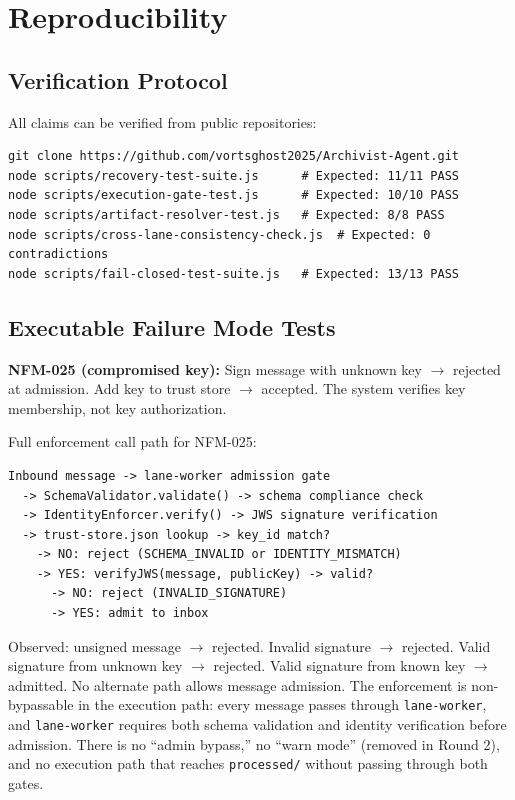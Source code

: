 \documentclass[11pt,letterpaper]{article}
\begin{document}
\section{Reproducibility}

\subsection{Verification Protocol}

All claims can be verified from public repositories:

\begin{verbatim}
git clone https://github.com/vortsghost2025/Archivist-Agent.git
node scripts/recovery-test-suite.js      # Expected: 11/11 PASS
node scripts/execution-gate-test.js      # Expected: 10/10 PASS
node scripts/artifact-resolver-test.js   # Expected: 8/8 PASS
node scripts/cross-lane-consistency-check.js  # Expected: 0 contradictions
node scripts/fail-closed-test-suite.js   # Expected: 13/13 PASS
\end{verbatim}

\subsection{Executable Failure Mode Tests}

\textbf{NFM-025 (compromised key):} Sign message with unknown key $\rightarrow$ rejected at admission. Add key to trust store $\rightarrow$ accepted. The system verifies key membership, not key authorization.

Full enforcement call path for NFM-025:

\begin{verbatim}
Inbound message -> lane-worker admission gate
  -> SchemaValidator.validate() -> schema compliance check
  -> IdentityEnforcer.verify() -> JWS signature verification
  -> trust-store.json lookup -> key_id match?
    -> NO: reject (SCHEMA_INVALID or IDENTITY_MISMATCH)
    -> YES: verifyJWS(message, publicKey) -> valid?
      -> NO: reject (INVALID_SIGNATURE)
      -> YES: admit to inbox
\end{verbatim}

Observed: unsigned message $\rightarrow$ rejected. Invalid signature $\rightarrow$ rejected. Valid signature from unknown key $\rightarrow$ rejected. Valid signature from known key $\rightarrow$ admitted. No alternate path allows message admission. The enforcement is non-bypassable in the execution path: every message passes through \texttt{lane-worker}, and \texttt{lane-worker} requires both schema validation and identity verification before admission. There is no ``admin bypass,'' no ``warn mode'' (removed in Round 2), and no execution path that reaches \texttt{processed/} without passing through both gates.
\end{document}
